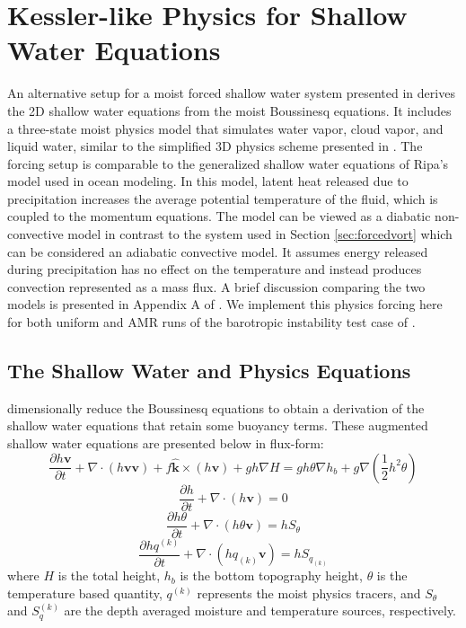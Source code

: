 \documentclass{ametsoc}
\begin{document}
\section{Kessler-like Physics for Shallow Water Equations}
\label{sec:kesslersw}
An alternative setup for a moist forced shallow water system presented in 
\cite{zerroukat2015moist} derives the 2D shallow water equations from 
the moist Boussinesq equations. It includes a three-state moist physics 
model that simulates water vapor, cloud vapor, and liquid water, 
similar to the simplified 3D physics scheme presented in 
\cite{kessler1969distribution}. The forcing setup
is comparable to the generalized shallow water equations of Ripa's 
model \citep{ripa1993conservation,ripa1995improving} 
used in ocean modeling.  
In this model, latent heat released due to precipitation increases 
the average potential temperature of the fluid, which is coupled
to the momentum equations. The model can be viewed as a
diabatic non-convective model in contrast to the system used in Section \ref{sec:forcedvort} 
which can be considered an adiabatic convective 
model. It assumes energy released during
precipitation has no effect on the temperature and instead 
produces convection represented as a mass flux. A
brief discussion comparing the two models
is presented in Appendix A of \cite{bouchut2009fronts}.
We implement this physics forcing here for both uniform and
AMR runs of the barotropic instability test case of
\cite{galewsky2004initial}.

\subsection{The Shallow Water and Physics Equations}
\cite{zerroukat2015moist} dimensionally reduce the Boussinesq equations 
to obtain a derivation of the shallow water equations that retain some
buoyancy terms. These augmented shallow water equations are presented below in flux-form:
   \begin{equation}
     \label{eq:swkesmom} \frac{\partial h \mathbf{v}}{\partial t} +
     \nabla \cdot (h \mathbf{v} \mathbf{v}) + f \mathbf{\hat{k}}\times(h\mathbf{v}) + gh\nabla H = 
     g h \theta \nabla h_b + g\nabla (\frac{1}{2}h^2\theta)
   \end{equation}
   \begin{equation}
     \label{eq:swkescon}  \frac{\partial h}{\partial t} + \nabla \cdot (h\mathbf{v}) = 0
   \end{equation}
   \begin{equation}
     \label{eq:swthetacon}  \frac{\partial h\theta}{\partial t} + \nabla \cdot (h \theta \mathbf{v}) = hS_\theta
   \end{equation}
   \begin{equation}
     \label{eq:swkesqcon}  \frac{\partial h q^{(k)}}{\partial t} + \nabla \cdot (h  q_{(k)} \mathbf{v}) = hS_{q_{(k)}}
   \end{equation}
where $H$ is the total height, $h_b$ is the bottom topography height, $\theta$ is the temperature based 
quantity, $q^{(k)}$ represents the moist physics tracers, and $S_\theta$ and $S_q^{(k)}$ are 
the depth averaged moisture and temperature sources, respectively. 
    
\end{document}
